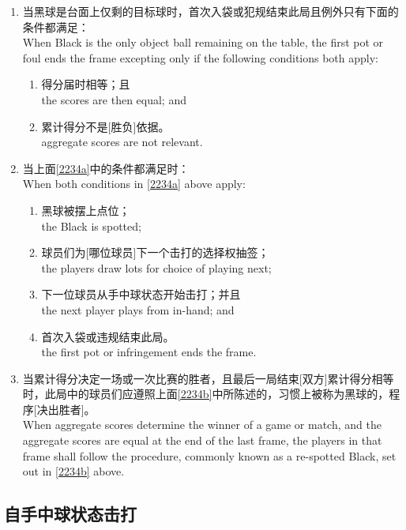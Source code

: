 \begin{enumerate}[label=(\alph*)]
    \item \label{2234a}当黑球是台面上仅剩的目标球时，首次入袋或犯规结束此局且例外只有下面的条件都满足：\\
    When Black is the only object ball remaining on the table, the first pot or foul ends the frame excepting only if the following conditions both apply:
    \begin{enumerate}[label=(\roman*)]
        \item 得分届时相等；且\\
        the scores are then equal; and
        \item 累计得分不是[胜负]依据。\\
        aggregate scores are not relevant.
    \end{enumerate}
    \item \label{2234b}当上面\ref{2234a}中的条件都满足时：\\
    When both conditions in \ref{2234a} above apply:
    \begin{enumerate}[label=(\roman*)]
        \item 黑球被摆上点位；\\
        the Black is spotted;
        \item 球员们为[哪位球员]下一个击打的选择权抽签；\\
        the players draw lots for choice of playing next;
        \item 下一位球员从手中球状态开始击打；并且\\
        the next player plays from in-hand; and
        \item 首次入袋或违规结束此局。\\
        the first pot or infringement ends the frame.
    \end{enumerate}
    \item 当累计得分决定一场或一次比赛的胜者，且最后一局结束[双方]累计得分相等时，此局中的球员们应遵照上面\ref{2234b}中所陈述的，习惯上被称为\respotted{}黑球的，程序[决出胜者]。\\
    When aggregate scores determine the winner of a game or match, and the aggregate scores are equal at the end of the last frame, the players in that frame shall follow the procedure, commonly known as a re-spotted Black, set out in \ref{2234b} above.
\end{enumerate}

\subsection{自手中球状态击打}

